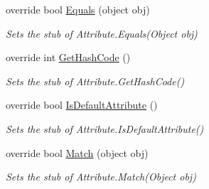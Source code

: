 \begin{DoxyCompactItemize}
override bool \hyperlink{class_system_1_1_runtime_1_1_remoting_1_1_metadata_1_1_fakes_1_1_stub_soap_attribute_a23c0a62f111c85df164b0ecb45d53159}{Equals} (object obj)
\begin{DoxyCompactList}\small\item\em Sets the stub of Attribute.\-Equals(\-Object obj)\end{DoxyCompactList}\item 
override int \hyperlink{class_system_1_1_runtime_1_1_remoting_1_1_metadata_1_1_fakes_1_1_stub_soap_attribute_a365e03174d0bc8206e47d4ee04e049d5}{Get\-Hash\-Code} ()
\begin{DoxyCompactList}\small\item\em Sets the stub of Attribute.\-Get\-Hash\-Code()\end{DoxyCompactList}\item 
override bool \hyperlink{class_system_1_1_runtime_1_1_remoting_1_1_metadata_1_1_fakes_1_1_stub_soap_attribute_a981191c1180820671f00fa97381810d3}{Is\-Default\-Attribute} ()
\begin{DoxyCompactList}\small\item\em Sets the stub of Attribute.\-Is\-Default\-Attribute()\end{DoxyCompactList}\item 
override bool \hyperlink{class_system_1_1_runtime_1_1_remoting_1_1_metadata_1_1_fakes_1_1_stub_soap_attribute_aaa4bd37737fc61337f625aff3db85c6a}{Match} (object obj)
\begin{DoxyCompactList}\small\item\em Sets the stub of Attribute.\-Match(\-Object obj)\end{DoxyCompactList}\end{DoxyCompactItemize}
